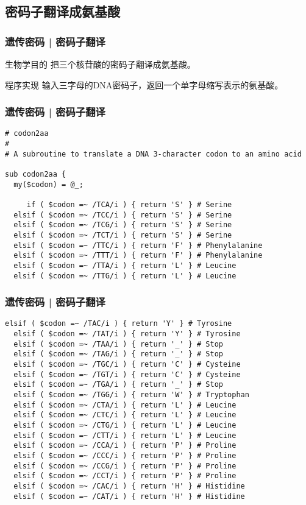\subsection{密码子翻译成氨基酸}
\begin{frame}
  \frametitle{遗传密码 | 密码子翻译}
  \begin{block}{生物学目的}
 把三个核苷酸的密码子翻译成氨基酸。 
  \end{block}
  \pause
  \begin{block}{程序实现}
    输入三字母的DNA密码子，返回一个单字母缩写表示的氨基酸。
  \end{block}
\end{frame}

\begin{frame}[fragile]
  \frametitle{遗传密码 | 密码子翻译}
\begin{lstlisting}[firstnumber=1,basicstyle=\footnotesize\tt,numberstyle=\scriptsize]
# codon2aa
#
# A subroutine to translate a DNA 3-character codon to an amino acid

sub codon2aa {
  my($codon) = @_;
          
     if ( $codon =~ /TCA/i ) { return 'S' } # Serine
  elsif ( $codon =~ /TCC/i ) { return 'S' } # Serine
  elsif ( $codon =~ /TCG/i ) { return 'S' } # Serine
  elsif ( $codon =~ /TCT/i ) { return 'S' } # Serine
  elsif ( $codon =~ /TTC/i ) { return 'F' } # Phenylalanine
  elsif ( $codon =~ /TTT/i ) { return 'F' } # Phenylalanine
  elsif ( $codon =~ /TTA/i ) { return 'L' } # Leucine
  elsif ( $codon =~ /TTG/i ) { return 'L' } # Leucine
\end{lstlisting}
\end{frame}

\begin{frame}[fragile]
  \frametitle{遗传密码 | 密码子翻译}
\begin{lstlisting}[firstnumber=16,basicstyle=\footnotesize\tt,numberstyle=\scriptsize]
  elsif ( $codon =~ /TAC/i ) { return 'Y' } # Tyrosine
  elsif ( $codon =~ /TAT/i ) { return 'Y' } # Tyrosine
  elsif ( $codon =~ /TAA/i ) { return '_' } # Stop
  elsif ( $codon =~ /TAG/i ) { return '_' } # Stop
  elsif ( $codon =~ /TGC/i ) { return 'C' } # Cysteine
  elsif ( $codon =~ /TGT/i ) { return 'C' } # Cysteine
  elsif ( $codon =~ /TGA/i ) { return '_' } # Stop
  elsif ( $codon =~ /TGG/i ) { return 'W' } # Tryptophan
  elsif ( $codon =~ /CTA/i ) { return 'L' } # Leucine
  elsif ( $codon =~ /CTC/i ) { return 'L' } # Leucine
  elsif ( $codon =~ /CTG/i ) { return 'L' } # Leucine
  elsif ( $codon =~ /CTT/i ) { return 'L' } # Leucine
  elsif ( $codon =~ /CCA/i ) { return 'P' } # Proline
  elsif ( $codon =~ /CCC/i ) { return 'P' } # Proline
  elsif ( $codon =~ /CCG/i ) { return 'P' } # Proline
  elsif ( $codon =~ /CCT/i ) { return 'P' } # Proline
  elsif ( $codon =~ /CAC/i ) { return 'H' } # Histidine
  elsif ( $codon =~ /CAT/i ) { return 'H' } # Histidine
\end{lstlisting}
\end{frame}

